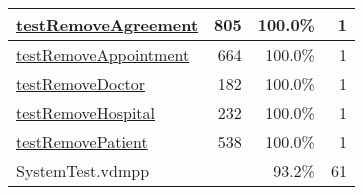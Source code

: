 \begin{longtable}{|l|r|r|r|}
\hline
\hyperref[testRemoveAgreement:805]{testRemoveAgreement} & 805&100.0\% & 1 \\
\hline
\hyperref[testRemoveAppointment:664]{testRemoveAppointment} & 664&100.0\% & 1 \\
\hline
\hyperref[testRemoveDoctor:182]{testRemoveDoctor} & 182&100.0\% & 1 \\
\hline
\hyperref[testRemoveHospital:232]{testRemoveHospital} & 232&100.0\% & 1 \\
\hline
\hyperref[testRemovePatient:538]{testRemovePatient} & 538&100.0\% & 1 \\
\hline
\hline
SystemTest.vdmpp & & 93.2\% & 61 \\
\hline
\end{longtable}

